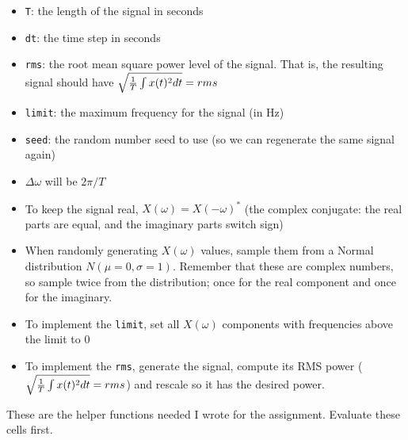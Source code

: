 \documentclass{article}
\begin{document}
\begin{itemize}
\item
  \texttt{T}: the length of the signal in seconds
\item
  \texttt{dt}: the time step in seconds
\item
  \texttt{rms}: the root mean square power level of the signal. That is,
  the resulting signal should have
  \(\sqrt{{1 \over T} \int{x(t)^2}dt}=rms\)
\item
  \texttt{limit}: the maximum frequency for the signal (in Hz)
\item
  \texttt{seed}: the random number seed to use (so we can regenerate the
  same signal again)
\item
  \(\Delta \omega\) will be \(2 \pi / T\)
\item
  To keep the signal real, \(X(\omega)=X(-\omega)^*\) (the complex
  conjugate: the real parts are equal, and the imaginary parts switch
  sign)
\item
  When randomly generating \(X(\omega)\) values, sample them from a
  Normal distribution \(N(\mu=0,\sigma=1)\). Remember that these are
  complex numbers, so sample twice from the distribution; once for the
  real component and once for the imaginary.
\item
  To implement the \texttt{limit}, set all \(X(\omega)\) components with
  frequencies above the limit to 0
\item
  To implement the \texttt{rms}, generate the signal, compute its RMS
  power (\(\sqrt{{1 \over T} \int{x(t)^2}dt}=rms\)) and rescale so it
  has the desired power.
\end{itemize}

    These are the helper functions needed I wrote for the assignment.
Evaluate these cells first.
\end{document}
